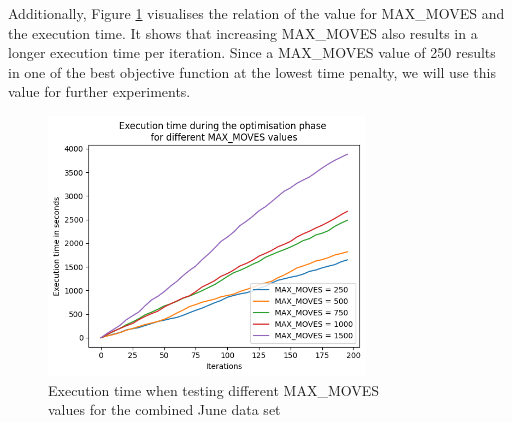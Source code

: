 Additionally, Figure \ref{fig:tuning_execution} visualises the relation of the value for MAX\_MOVES and the execution time. It shows that increasing MAX\_MOVES also results in a longer execution time per iteration. Since a MAX\_MOVES value of 250 results in one of the best objective function at the lowest time penalty, we will use this value for further experiments. 

\begin{figure}[H]
	\centering
	\includegraphics[width=0.75\textwidth]{images/tuning/max_moves_execution.png} 
	\caption{Execution time when testing different MAX\_MOVES \\values for the combined June data set}
	\label{fig:tuning_execution}
\end{figure}

